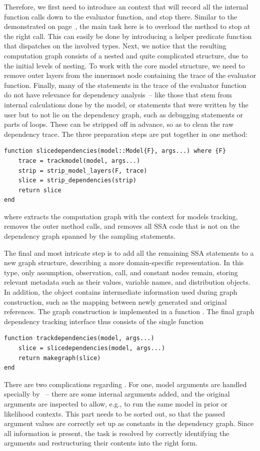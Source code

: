 Therefore, we first need to introduce an \irtrackerjl{} context that will record all the internal
function calls down to the evaluator function, and stop there.  Similar to the
 demonstrated on page~\pageref{lst:depthlimitcontext}, the main task here
is to overload the  method to stop at the right call.  This can easily be done by
introducing a helper predicate function  that dispatches on the involved types.
Next, we notice that the resulting computation graph consists of a nested and quite complicated
structure, due to the initial levels of nesting.  To work with the core model structure, we need to
remove outer layers from the innermost node containing the trace of the evaluator function.
Finally, many of the statements in the trace of the evaluator function do not have relevance for
dependency analysis~-- like those that stem from internal calculations done by the model, or
statements that were written by the user but to not lie on the dependency graph, such as debugging
statements or parts of loops.  These can be stripped off in advance, so as to clean the raw
dependency trace.  The three preparation steps are put together in one method:
\begin{lstlisting}
function slicedependencies(model::Model{F}, args...) where {F}
    trace = trackmodel(model, args...)
    strip = strip_model_layers(F, trace)
    slice = strip_dependencies(strip)
    return slice
end
\end{lstlisting}
where  extracts the computation graph with the context for models tracking,
 removes the outer method calls, and  removes
all SSA code that is not on the dependency graph spanned by the sampling statements.

The final and most intricate step is to add all the remaining SSA statements to a new graph
structure, describing a more domain-specific representation.  In this  type, only
assumption, observation, call, and constant nodes remain, storing relevant metadata such as their
values, variable names, and distribution objects.  In addition, the object contains intermediate
information used during graph construction, such as the mapping between newly generated and original
references.  The graph construction is implemented in a function .  The final graph
dependency tracking interface thus consists of the single function
\begin{lstlisting}
function trackdependencies(model, args...)
    slice = slicedependencies(model, args...)
    return makegraph(slice)
end
\end{lstlisting}
There are two complications regarding .  For one, model arguments are handled
specially by \dppljl{}~-- there are some internal arguments added, and the original arguments are
inspected to allow, e.g., to run the same model in prior or likelihood contexts.  This part needs to
be sorted out, so that the passed argument values are correctly set up as constants in the
dependency graph.  Since all information is present, the task is resolved by correctly identifying
the arguments and restructuring their contents into the right form.

